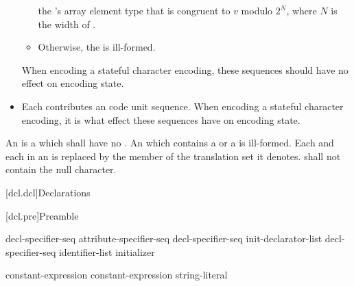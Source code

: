 \documentclass{wg21}
\begin{document}
\begin{itemize}
\begin{itemize}
        the 's array element type 
        that is congruent to $v$ modulo $2^N$, where $N$ is the width of .
        \item
        Otherwise, the  is ill-formed.
    \end{itemize}
    When encoding a stateful character encoding,
    these sequences should have no effect on encoding state.
    \item
    Each 
    contributes an
    code unit sequence.
    When encoding a stateful character encoding,
    it is
    what effect these sequences have on encoding state.
\end{itemize}

\begin{addedblock}
An  is a  which shall have no .
An  which contains a 
or a  is ill-formed.
Each  and each  in an  is replaced by the member of the translation set it denotes.
 shall not contain the null character.
\end{addedblock}


[dcl.dcl]{Declarations}%

[dcl.pre]{Preamble}

\begin{bnf}
    \br
    decl-specifier-seq  \terminal{;}\br
    attribute-specifier-seq decl-specifier-seq init-declarator-list \terminal{;}\br
     decl-specifier-seq  \terminal{[} identifier-list \terminal{]} initializer \terminal{;}
\end{bnf}

\begin{bnf}
    \br
     \terminal{(} constant-expression \terminal{)} \terminal{;}\br
     \terminal{(} constant-expression \terminal{,} string-literal \terminal{)} \terminal{;}
\end{bnf}
\end{document}
